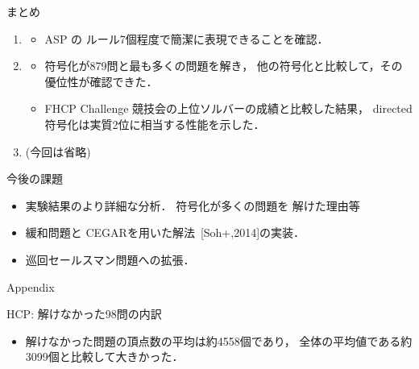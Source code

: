 \documentclass[dvipdfmx]{beamer}
\begin{document}
\begin{frame}{まとめ}

\begin{enumerate}
\item {}
  \begin{itemize}
  \item ASP の \alert{ルール7個}程度で簡潔に表現できることを確認．
  \end{itemize}
\item {}
  \begin{itemize}
  \item {} 符号化が879問と最も多くの問題を解き，
    他の符号化と比較して，その優位性が確認できた．
  \item FHCP Challenge 競技会の上位ソルバーの成績と比較した結果，
    directed 符号化は\alert{実質2位}に相当する性能を示した．
  \end{itemize}
\item {} (今回は省略)
\end{enumerate}

\begin{block}{今後の課題}
  \begin{itemize}
  \item 実験結果のより詳細な分析． 符号化が多くの問題を
    解けた理由等
  \item 緩和問題と CEGARを用いた解法~{\scriptsize[Soh+,2014]}の実装．
  \item 巡回セールスマン問題への拡張．
  \end{itemize}
\end{block}
\end{frame}
\appendix
\begin{frame}{}
  \begin{center}\Huge
    Appendix
  \end{center}
\end{frame}

\begin{frame}[noframenumbering]{HCP: 解けなかった98問の内訳}



\begin{itemize}
\item 解けなかった問題の頂点数の平均は約4558個であり，
      全体の平均値である約3099個と比較して大きかった．
\end{itemize}
\end{frame}
\end{document}
